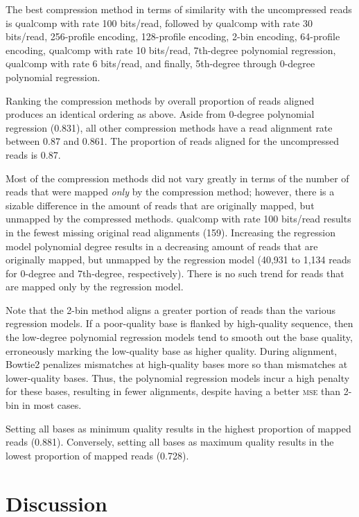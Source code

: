 \documentclass{bioinfo}
\begin{document}
The best compression method in terms of similarity with the
uncompressed reads is \textsc{q}ual\textsc{c}omp with rate 100
bits/read, followed by \textsc{q}ual\textsc{c}omp with rate 30
bits/read, 256-profile encoding, 128-profile encoding, 2-bin encoding,
64-profile encoding, \textsc{q}ual\textsc{c}omp with rate 10
bits/read, 7th-degree polynomial regression,
\textsc{q}ual\textsc{c}omp with rate 6 bits/read, and finally,
5th-degree through 0-degree polynomial regression.

Ranking the compression methods by overall proportion of reads aligned
produces an identical ordering as above. Aside from 0-degree
polynomial regression (0.831), all other compression methods have a
read alignment rate between 0.87 and 0.861. The proportion of reads
aligned for the uncompressed reads is 0.87.

Most of the compression methods did not vary greatly in terms of the
number of reads that were mapped \emph{only} by the compression
method; however, there is a sizable difference in the amount of reads
that are originally mapped, but unmapped by the compressed methods.
\textsc{q}ual\textsc{c}omp with rate 100 bits/read results in the
fewest missing original read alignments (159). Increasing the
regression model polynomial degree results in a decreasing amount of
reads that are originally mapped, but unmapped by the regression model
(40,931 to 1,134 reads for 0-degree and 7th-degree,
respectively). There is no such trend for reads that are mapped only
by the regression model.

Note that the 2-bin method aligns a greater portion of reads than the
various regression models. If a poor-quality base is flanked by
high-quality sequence, then the low-degree polynomial regression
models tend to smooth out the base quality, erroneously marking the
low-quality base as higher quality.  During alignment, Bowtie2
penalizes mismatches at high-quality bases more so than mismatches at
lower-quality bases. Thus, the polynomial regression models incur a
high penalty for these bases, resulting in fewer alignments, despite
having a better \textsc{mse} than 2-bin in most cases.

Setting all bases as minimum quality results in the highest proportion
of mapped reads (0.881). Conversely, setting all bases as maximum
quality results in the lowest proportion of mapped reads (0.728).

\section{Discussion}
\end{document}
